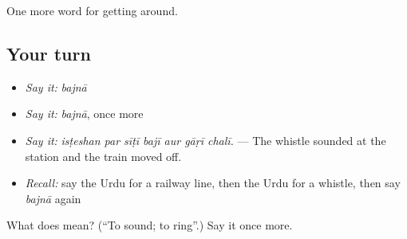 \begin{grammarlens}[title={What you've built}]
One more word for getting around.
\end{grammarlens}

\subsection*{Your turn}
\begin{itemize}
\raggedright
  \item \emph{Say it:} \emph{bajnā}
  \item \emph{Say it:} \emph{bajnā}, once more
  \item \emph{Say it:} \emph{isṭeshan par sīṭī bajī aur gāṛī chalī.} — The whistle sounded at the station and the train moved off.
  \item \emph{Recall:} say the Urdu for a railway line, then the Urdu for a whistle, then say \emph{bajnā} again
\end{itemize}

\begin{tcolorbox}[breakable,colback=teal!4,colframe=teal!35!black,title={Before you move on}]
What does  mean? (\textquotedblleft{}To sound; to ring\textquotedblright{}.) Say it once more.
\end{tcolorbox}

